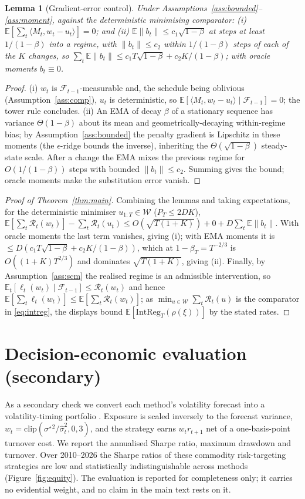 \documentclass[authoryear,preprint,12pt]{elsarticle}
\theoremstyle{plain}
\newtheorem{lemma}{Lemma}
\theoremstyle{remark}
\newcommand{\E}{\mathbb{E}}
\begin{document}
\begin{lemma}[Gradient-error control]\label{lem:mom}
Under Assumptions~\ref{ass:bounded}--\ref{ass:moment}, against the deterministic
minimising comparator: (i) $\E[\sum_t\langle M_t,w_t-u_t\rangle]=0$; and (ii)
$\E\|b_t\|\le c_1\sqrt{1-\beta}$ at steps at least $1/(1-\beta)$ into a regime, with
$\|b_t\|\le c_2$ within $1/(1-\beta)$ steps of each of the $K$ changes, so
$\sum_t\E\|b_t\|\le c_1 T\sqrt{1-\beta}+c_2 K/(1-\beta)$; with oracle moments $b_t\equiv0$.
\end{lemma}
\begin{proof}
(i) $w_t$ is $\mathcal F_{t-1}$-measurable and, the schedule being oblivious
(Assumption~\ref{ass:comp}), $u_t$ is deterministic, so
$\E[\langle M_t,w_t-u_t\rangle\mid\mathcal F_{t-1}]=0$; the tower rule concludes. (ii) An
EMA of decay $\beta$ of a stationary sequence has variance $\Theta(1-\beta)$ about its
mean and geometrically-decaying within-regime bias; by Assumption~\ref{ass:bounded} the
penalty gradient is Lipschitz in these moments (the $\epsilon$-ridge bounds the
inverse), inheriting the $\Theta(\sqrt{1-\beta})$ steady-state scale. After a change the
EMA mixes the previous regime for $O(1/(1-\beta))$ steps with bounded $\|b_t\|\le c_2$.
Summing gives the bound; oracle moments make the substitution error vanish.
\end{proof}

\begin{proof}[Proof of Theorem~\ref{thm:main}]
Combining the lemmas and taking expectations, for the deterministic minimiser
$u_{1:T}\in\mathcal{W}$ ($P_T\le 2DK$),
$\E[\sum_t\mathcal{R}_t(w_t)]-\sum_t\mathcal{R}_t(u_t)\le O(\sqrt{T(1+K)})+0+D\sum_t\E\|b_t\|$.
With oracle moments the last term vanishes, giving (i); with EMA moments it is
$\le D(c_1T\sqrt{1-\beta}+c_2K/(1-\beta))$, which at $1-\beta_T=T^{-2/3}$ is
$O((1+K)T^{2/3})$ and dominates $\sqrt{T(1+K)}$, giving (ii). Finally, by
Assumption~\ref{ass:scm} the realised regime is an admissible intervention, so
$\E_t[\ell_t(w_t)\mid\mathcal F_{t-1}]\le\mathcal{R}_t(w_t)$ and hence
$\E[\sum_t\ell_t(w_t)]\le\E[\sum_t\mathcal{R}_t(w_t)]$; as
$\min_{u\in\mathcal{W}}\sum_t\mathcal{R}_t(u)$ is the comparator in \eqref{eq:intreg}, the
displays bound $\E[\mathrm{IntReg}_T(\rho(\xi))]$ by the stated rates.
\end{proof}

\section{Decision-economic evaluation (secondary)}\label{app:econ}
As a secondary check we convert each method's volatility forecast into a
volatility-timing portfolio \citep{fleming2001voltiming}. Exposure is scaled inversely
to the forecast variance, $w_t=\mathrm{clip}(\sigma^\star{}^2/\hat\sigma_t^2,0,3)$, and
the strategy earns $w_t r_{t+1}$ net of a one-basis-point turnover cost. We report the
annualised Sharpe ratio, maximum drawdown and turnover. Over 2010--2026 the Sharpe ratios
of these commodity risk-targeting strategies are low and statistically indistinguishable
across methods (Figure~\ref{fig:equity}). The evaluation is reported for completeness
only; it carries no evidential weight, and no claim in the main text rests on it.
\end{document}
